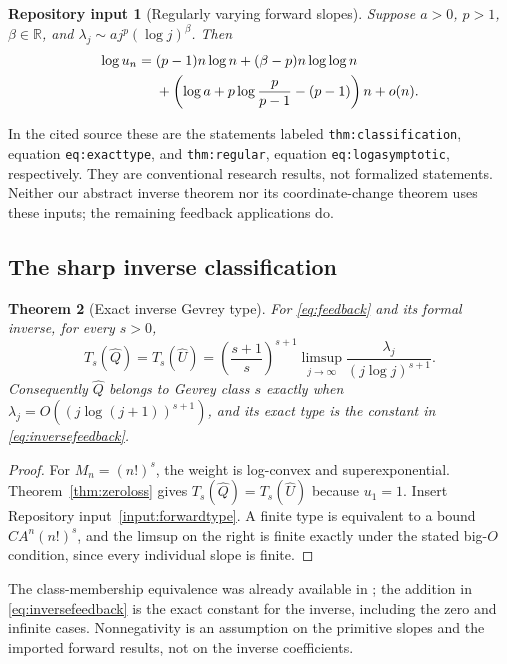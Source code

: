 \documentclass[11pt,a4paper]{article}
\numberwithin{equation}{section}
\newtheorem{theorem}{Theorem}[section]
\newtheorem{inputtheorem}[theorem]{Repository input}
\theoremstyle{definition}
\theoremstyle{remark}
\newcommand{\R}{\mathbb R}
\newcommand{\Q}{\widehat Q}
\newcommand{\U}{\widehat U}
\begin{document}
\begin{inputtheorem}[Regularly varying forward slopes]
\label{input:forwardasymptotic}
Suppose $a>0$, $p>1$, $\beta\in\R$, and
$\lambda_j\sim a j^p(\log j)^\beta$. Then
\begin{align}
 \log u_n={}&(p-1)n\log n+(\beta-p)n\log\log n
 \notag\\
 &+\left(\log a+p\log\frac{p}{p-1}-(p-1)\right)n+o(n).
 \label{eq:forwardasymptotic}
\end{align}
\end{inputtheorem}

In the cited source these are the statements labeled
\texttt{thm:classification}, equation \texttt{eq:exacttype}, and
\texttt{thm:regular}, equation \texttt{eq:logasymptotic}, respectively.
They are conventional research results, not formalized statements.
Neither our abstract inverse theorem nor its coordinate-change theorem
uses these inputs; the remaining feedback applications do.

\subsection{The sharp inverse classification}

\begin{theorem}[Exact inverse Gevrey type]
\label{thm:inversefeedback}
For \eqref{eq:feedback} and its formal inverse, for every $s>0$,
\begin{equation}
 \boxed{\displaystyle
 T_s(\Q)=T_s(\U)
 =\left(\frac{s+1}{s}\right)^{s+1}
   \limsup_{j\to\infty}\frac{\lambda_j}{(j\log j)^{s+1}}.}
 \label{eq:inversefeedback}
\end{equation}
Consequently $\Q$ belongs to Gevrey class $s$ exactly when
$\lambda_j=O((j\log(j+1))^{s+1})$, and its exact type is the constant
in \eqref{eq:inversefeedback}.
\end{theorem}
\begin{proof}
For $M_n=(n!)^s$, the weight is log-convex and superexponential.
Theorem~\ref{thm:zeroloss} gives $T_s(\Q)=T_s(\U)$ because $u_1=1$.
Insert Repository input~\ref{input:forwardtype}. A finite type is
equivalent to a bound $CA^n(n!)^s$, and the limsup on the right is
finite exactly under the stated big-$O$ condition, since every individual
slope is finite.
\end{proof}

The class-membership equivalence was already available in
\cite{feedback}; the addition in \eqref{eq:inversefeedback} is the exact
constant for the inverse, including the zero and infinite cases.
Nonnegativity is an assumption on the primitive slopes and the imported
forward results, not on the inverse coefficients.
\end{document}
